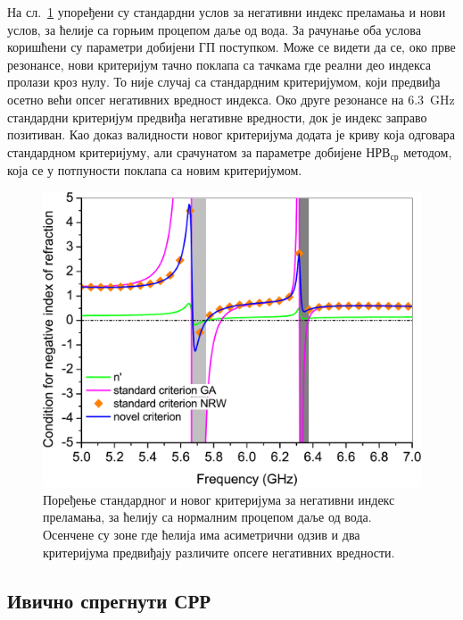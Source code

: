 \documentclass[main.tex]{subfiles}
\begin{document}
На сл.~\ref{usl_norm} упоређени су стандардни услов за негативни индекс преламања и нови услов, за ћелије са горњим процепом даље од вода. За рачунање оба услова коришћени су параметри добијени ГП поступком. Може се видети да се, око прве резонансе, нови критеријум тачно поклапа са тачкама где реални део индекса пролази кроз нулу. То није случај са стандардним критеријумом, који предвиђа осетно већи опсег негативних вредност индекса. Око друге резонансе на \SI{6.3}{\giga\hertz} стандардни критеријум предвиђа негативне вредности, док је индекс заправо позитиван. Као доказ валидности новог критеријума додата је криву која одговара стандардном критеријуму, али срачунатом за параметре добијене $НРВ_{ср}$ методом, која се у потпуности поклапа са новим критеријумом.
\begin{figure}[!t]
\centering
\includegraphics[scale=\SkalaC]{slike/usl_norm.pdf}
\caption{Поређење стандардног и новог критеријума за негативни индекс преламања, за ћелију са нормалним процепом даље од вода. Осенчене су зоне где ћелија има асиметрични одзив и два критеријума предвиђају различите опсеге негативних вредности.}
\label{usl_norm}
\end{figure}

\subsection{Ивично спрегнути СРР}%
\end{document}
